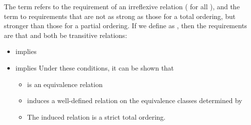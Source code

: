\begin{addedblock}
\begin{itemdescr}
{\color{black}
\pnum
The term
refers to the
requirement of an irreflexive relation ( for all ),
and the term
to requirements that are not as strong as
those for a total ordering,
but stronger than those for a partial
ordering.
If we define
as
,
then the requirements are that
and
both be transitive  relations:

\begin{itemize}
\item
{}
implies
\item
{}
implies
\enternote
Under these conditions, it can be shown that
\begin{itemize}
\item
{}
is an equivalence relation
\item
{}
induces a well-defined relation on the equivalence
classes determined by
\item
The induced relation is a strict total ordering.
\exitnote
\end{itemize}
\end{itemize}
}
\end{itemdescr}
\end{addedblock}
